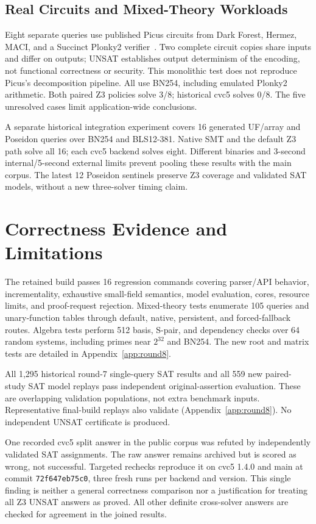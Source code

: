 \documentclass[runningheads]{llncs}
\begin{document}
\subsection{Real Circuits and Mixed-Theory Workloads}

Eight separate queries use published Picus circuits from Dark Forest, Hermez,
MACI, and a Succinct Plonky2 verifier~\cite{picus}. Two complete circuit copies
share inputs and differ on outputs; UNSAT establishes output determinism of the
encoding, not functional correctness or security. This monolithic test does not
reproduce Picus's decomposition pipeline. All use BN254, including emulated
Plonky2 arithmetic. Both paired Z3 policies solve 3/8; historical cvc5 solves
0/8. The five unresolved cases limit application-wide conclusions.

A separate historical integration experiment covers 16 generated UF/array
and Poseidon queries over BN254 and BLS12-381. Native SMT and the default Z3
path solve all 16; each cvc5 backend solves eight. Different binaries and
3-second internal/5-second external limits prevent pooling these results with
the main corpus. The latest 12 Poseidon sentinels preserve Z3 coverage and
validated SAT models, without a new three-solver timing claim.

\section{Correctness Evidence and Limitations}
\label{sec:limits}

The retained build passes 16 regression commands covering parser/API behavior,
incrementality, exhaustive small-field semantics, model evaluation, cores,
resource limits, and proof-request rejection. Mixed-theory tests enumerate 105
queries and unary-function tables through default, native, persistent, and
forced-fallback routes. Algebra tests perform 512 basis, S-pair, and dependency
checks over 64 random systems, including primes near $2^{32}$ and BN254.
The new root and matrix tests are detailed in Appendix~\ref{app:round8}.

All 1,295 historical round-7 single-query SAT results and all 559 new paired-study
SAT model replays pass independent original-assertion evaluation. These are
overlapping validation populations, not extra benchmark inputs. Representative
final-build replays also validate (Appendix~\ref{app:round8}). No independent
UNSAT certificate is produced.

One recorded cvc5 split answer in the public corpus was refuted by independently
validated SAT assignments. The raw answer remains archived but is scored as
wrong, not successful. Targeted rechecks reproduce it on cvc5 1.4.0 and main at commit
\texttt{72f647eb75c0}, three fresh runs per backend and version. This
single finding is neither a general correctness comparison nor a justification
for treating all Z3 UNSAT answers as proved. All other definite cross-solver
answers are checked for agreement in the joined results.
\end{document}
